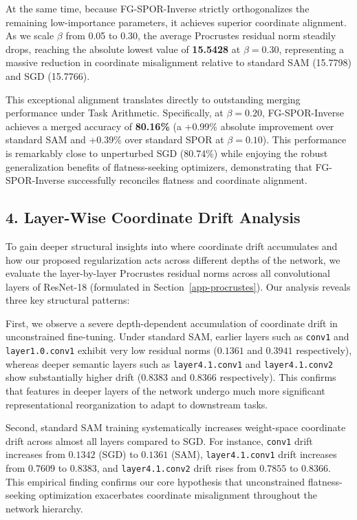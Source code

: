 \documentclass{article}
\theoremstyle{plain}
\theoremstyle{definition}
\theoremstyle{remark}
\begin{document}
At the same time, because FG-SPOR-Inverse strictly orthogonalizes the remaining low-importance parameters, it achieves superior coordinate alignment. As we scale $\beta$ from 0.05 to 0.30, the average Procrustes residual norm steadily drops, reaching the absolute lowest value of \textbf{15.5428} at $\beta=0.30$, representing a massive reduction in coordinate misalignment relative to standard SAM (15.7798) and SGD (15.7766). 

This exceptional alignment translates directly to outstanding merging performance under Task Arithmetic. Specifically, at $\beta=0.20$, FG-SPOR-Inverse achieves a merged accuracy of \textbf{80.16\%} (a +0.99\% absolute improvement over standard SAM and +0.39\% over standard SPOR at $\beta=0.10$). This performance is remarkably close to unperturbed SGD (80.74\%) while enjoying the robust generalization benefits of flatness-seeking optimizers, demonstrating that FG-SPOR-Inverse successfully reconciles flatness and coordinate alignment.

\subsection*{4. Layer-Wise Coordinate Drift Analysis}
To gain deeper structural insights into where coordinate drift accumulates and how our proposed regularization acts across different depths of the network, we evaluate the layer-by-layer Procrustes residual norms across all convolutional layers of ResNet-18 (formulated in Section~\ref{app-procrustes}). Our analysis reveals three key structural patterns:

First, we observe a severe depth-dependent accumulation of coordinate drift in unconstrained fine-tuning. Under standard SAM, earlier layers such as \texttt{conv1} and \texttt{layer1.0.conv1} exhibit very low residual norms ($0.1361$ and $0.3941$ respectively), whereas deeper semantic layers such as \texttt{layer4.1.conv1} and \texttt{layer4.1.conv2} show substantially higher drift ($0.8383$ and $0.8366$ respectively). This confirms that features in deeper layers of the network undergo much more significant representational reorganization to adapt to downstream tasks.

Second, standard SAM training systematically increases weight-space coordinate drift across almost all layers compared to SGD. For instance, \texttt{conv1} drift increases from $0.1342$ (SGD) to $0.1361$ (SAM), \texttt{layer4.1.conv1} drift increases from $0.7609$ to $0.8383$, and \texttt{layer4.1.conv2} drift rises from $0.7855$ to $0.8366$. This empirical finding confirms our core hypothesis that unconstrained flatness-seeking optimization exacerbates coordinate misalignment throughout the network hierarchy.
\end{document}
